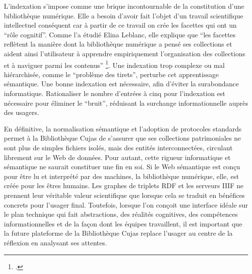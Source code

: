 L'indexation s'impose comme une brique incontournable de la constitution d'une bibliothèque numérique. Elle a besoin d'avoir fait l'objet d'un travail scientifique intellectuel conséquent car à partir de ce travail on crée les facettes qui ont un \enquote{rôle cognitif}. Comme l'a étudié Elina Leblanc, elle explique que \enquote{les facettes reflètent la manière dont la bibliothèque numérique a pensé ses collections et aident ainsi l'utilisateur à apprendre empiriquement l'organisation des collections et à naviguer parmi les contenus} \footcite{leblancBibliothequesNumeriquesEnrichies}. Une indexation trop complexe ou mal hiérarchisée, comme le \enquote{problème des tirets}, perturbe cet apprentissage sémantique. Une bonne indexation est nécessaire, afin d'éviter la surabondance informatique. Rationaliser le nombre d'entrées à cinq pour l'indexation est nécessaire pour éliminer le \enquote{bruit}, réduisant la surchange informationnelle auprès des usagers.
\bigskip

En définitive, la normalisation sémantique et l'adoption de protocoles standards permet à la Bibliothèque Cujas de s'assurer que ses collections patrimoniales ne sont plus de simples fichiers isolés, mais des entités interconnectées, circulant librement sur le Web de données. Pour autant, cette rigueur informatique et sémantique ne saurait constituer une fin en soi. Si le Web sémantique est conçu pour être lu et interprété par des machines, la bibliothèque numérique, elle, est créée pour les êtres humains. Les graphes de triplets \ac{RDF} et les serveurs \ac{IIIF} ne prennent leur véritable valeur scientifique que lorsque cela se traduit en bénéfices concrets pour l'usager final. Toutefois, lorsque l'on conçoit une interface idéale sur le plan technique qui fait abstractions, des réalités cognitives, des compétences informationnelles et de la façon dont les équipes travaillent, il est important que la future plateforme de la Bibliothèque Cujas replace l'usager au centre de la réflexion en analysant ses attentes.